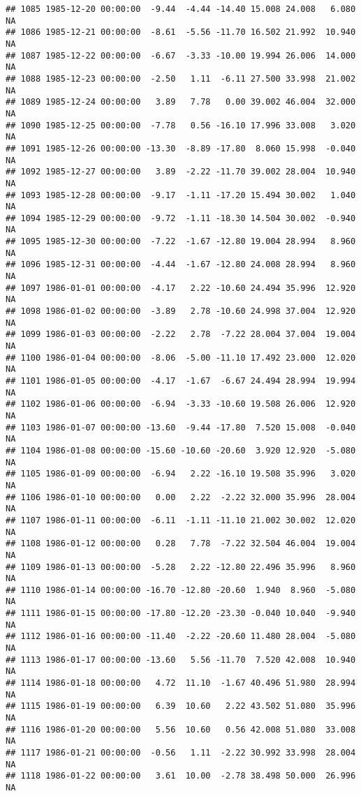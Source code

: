 \documentclass{article}\usepackage{graphicx, color}
\makeatletter
\newenvironment{kframe}{%
 \def\at@end@of@kframe{}%
 \ifinner\ifhmode%
  \def\at@end@of@kframe{\end{minipage}}%
  \begin{minipage}{\columnwidth}%
 \fi\fi%
 \def\FrameCommand##1{\hskip\@totalleftmargin \hskip-\fboxsep
 \colorbox{shadecolor}{##1}\hskip-\fboxsep
     \hskip-\linewidth \hskip-\@totalleftmargin \hskip\columnwidth}%
 \MakeFramed {\advance\hsize-\width
   \@totalleftmargin\z@ \linewidth\hsize
   \@setminipage}}%
 {\par\unskip\endMakeFramed%
 \at@end@of@kframe}
\newenvironment{knitrout}{}{} %
\makeatother
\begin{document}
\begin{knitrout}
\begin{kframe}
\begin{verbatim}
## 1085 1985-12-20 00:00:00  -9.44  -4.44 -14.40 15.008 24.008   6.080     NA
## 1086 1985-12-21 00:00:00  -8.61  -5.56 -11.70 16.502 21.992  10.940     NA
## 1087 1985-12-22 00:00:00  -6.67  -3.33 -10.00 19.994 26.006  14.000     NA
## 1088 1985-12-23 00:00:00  -2.50   1.11  -6.11 27.500 33.998  21.002     NA
## 1089 1985-12-24 00:00:00   3.89   7.78   0.00 39.002 46.004  32.000     NA
## 1090 1985-12-25 00:00:00  -7.78   0.56 -16.10 17.996 33.008   3.020     NA
## 1091 1985-12-26 00:00:00 -13.30  -8.89 -17.80  8.060 15.998  -0.040     NA
## 1092 1985-12-27 00:00:00   3.89  -2.22 -11.70 39.002 28.004  10.940     NA
## 1093 1985-12-28 00:00:00  -9.17  -1.11 -17.20 15.494 30.002   1.040     NA
## 1094 1985-12-29 00:00:00  -9.72  -1.11 -18.30 14.504 30.002  -0.940     NA
## 1095 1985-12-30 00:00:00  -7.22  -1.67 -12.80 19.004 28.994   8.960     NA
## 1096 1985-12-31 00:00:00  -4.44  -1.67 -12.80 24.008 28.994   8.960     NA
## 1097 1986-01-01 00:00:00  -4.17   2.22 -10.60 24.494 35.996  12.920     NA
## 1098 1986-01-02 00:00:00  -3.89   2.78 -10.60 24.998 37.004  12.920     NA
## 1099 1986-01-03 00:00:00  -2.22   2.78  -7.22 28.004 37.004  19.004     NA
## 1100 1986-01-04 00:00:00  -8.06  -5.00 -11.10 17.492 23.000  12.020     NA
## 1101 1986-01-05 00:00:00  -4.17  -1.67  -6.67 24.494 28.994  19.994     NA
## 1102 1986-01-06 00:00:00  -6.94  -3.33 -10.60 19.508 26.006  12.920     NA
## 1103 1986-01-07 00:00:00 -13.60  -9.44 -17.80  7.520 15.008  -0.040     NA
## 1104 1986-01-08 00:00:00 -15.60 -10.60 -20.60  3.920 12.920  -5.080     NA
## 1105 1986-01-09 00:00:00  -6.94   2.22 -16.10 19.508 35.996   3.020     NA
## 1106 1986-01-10 00:00:00   0.00   2.22  -2.22 32.000 35.996  28.004     NA
## 1107 1986-01-11 00:00:00  -6.11  -1.11 -11.10 21.002 30.002  12.020     NA
## 1108 1986-01-12 00:00:00   0.28   7.78  -7.22 32.504 46.004  19.004     NA
## 1109 1986-01-13 00:00:00  -5.28   2.22 -12.80 22.496 35.996   8.960     NA
## 1110 1986-01-14 00:00:00 -16.70 -12.80 -20.60  1.940  8.960  -5.080     NA
## 1111 1986-01-15 00:00:00 -17.80 -12.20 -23.30 -0.040 10.040  -9.940     NA
## 1112 1986-01-16 00:00:00 -11.40  -2.22 -20.60 11.480 28.004  -5.080     NA
## 1113 1986-01-17 00:00:00 -13.60   5.56 -11.70  7.520 42.008  10.940     NA
## 1114 1986-01-18 00:00:00   4.72  11.10  -1.67 40.496 51.980  28.994     NA
## 1115 1986-01-19 00:00:00   6.39  10.60   2.22 43.502 51.080  35.996     NA
## 1116 1986-01-20 00:00:00   5.56  10.60   0.56 42.008 51.080  33.008     NA
## 1117 1986-01-21 00:00:00  -0.56   1.11  -2.22 30.992 33.998  28.004     NA
## 1118 1986-01-22 00:00:00   3.61  10.00  -2.78 38.498 50.000  26.996     NA

\end{verbatim}
\end{kframe}
\end{knitrout}
\end{document}
